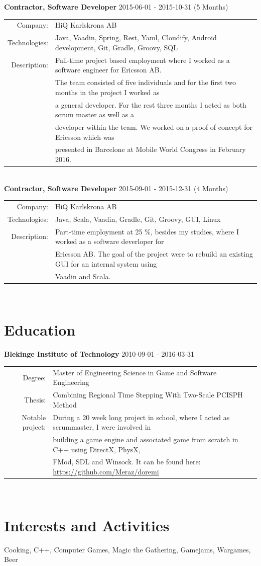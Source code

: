 \documentclass[a4paper,10pt]{article}
\begin{document}
\textbf{Contractor, Software Developer} 2015-06-01 - 2015-10-31 (5 Months)\\
\begin{tabular}{rl}
Company:& HiQ Karlskrona AB \\
Technologies:&  Java, Vaadin, Spring, Rest, Yaml, Cloudify, Android development, Git, Gradle, Groovy, SQL\\
Description:& Full-time project based employment where I worked as a software engineer for Ericsson AB.\\&
The team consisted of five individuals and for the first two months in the project I worked as\\&
a general developer. For the rest three months I acted as both scrum master as well as a\\&
developer within the team. We worked on a proof of concept for Ericsson which was\\& 
presented in Barcelone at Mobile World Congress in February 2016.\\
\end{tabular}\\

\textbf{Contractor, Software Developer} 2015-09-01 - 2015-12-31 (4 Months) \\
\begin{tabular}{rl}
Company:& HiQ Karlskrona AB \\
Technologies:&  Java, Scala, Vaadin, Gradle, Git, Groovy, GUI, Linux\\
Description:& Part-time employment at 25 \%, besides my studies, where I worked as a software deverloper for\\&
Ericsson AB. The goal of the project were to rebuild an existing GUI for an internal system using\\&
Vaadin and Scala.
\end{tabular}\\

\section{Education}
\textbf{Blekinge Institute of Technology} 2010-09-01 - 2016-03-31 \\
\begin{tabular}{rl}
Degree:&  Master of Engineering Science in Game and Software Engineering\\
Thesis:& Combining Regional Time Stepping With Two-Scale PCISPH Method\\
Notable project:& During a 20 week long project in school, where I acted as scrummaster, I were involved in\\&
building a game engine and  associated game from scratch in C++ using DirectX, PhysX,\\&
FMod, SDL and Winsock. It can be found here: \url{https://github.com/Meraz/doremi}
\end{tabular}\\

\section{Interests and Activities}
Cooking, C++, Computer Games, Magic the Gathering, Gamejams, Wargames, Beer
\end{document}
